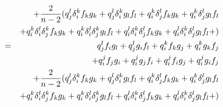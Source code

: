 \documentclass{article}
\begin{document}
\begin{eqnarray*}
      && + {2 \over n - 2}
      (
        q_j^l\delta_i^kf_kg_k + q_j^l\delta_i^kg_lf_l + 
        q_i^k\delta_j^lf_kg_k + q_i^k\delta_j^lg_lf_l \\
        && + q_i^k\delta_i^l\delta_j^kf_kg_k + q_i^k\delta_i^l\delta_j^kg_lf_l + 
        q_i^l\delta_i^k\delta_j^lf_kg_k + q_i^l\delta_i^k\delta_j^lg_lf_l +
      )\\
  &=& q_j^lf_ig_l + q_j^lg_if_l + q_i^kf_kg_j + q_i^kg_kf_j \\
      && + q_i^jf_jg_i + q_i^jg_jf_i + 
      q_i^jf_ig_j + q_i^jg_if_j \\
      && + {2 \over n - 2}
      (
        q_j^l\delta_i^kf_kg_k + q_j^l\delta_i^kg_lf_l + 
        q_i^k\delta_j^lf_kg_k + q_i^k\delta_j^lg_lf_l \\
        && + q_i^k\delta_i^l\delta_j^kf_kg_k + q_i^k\delta_i^l\delta_j^kg_lf_l + 
        q_i^l\delta_i^k\delta_j^lf_kg_k + q_i^l\delta_i^k\delta_j^lg_lf_l +
      )\\
\end{eqnarray*}
\end{document}
